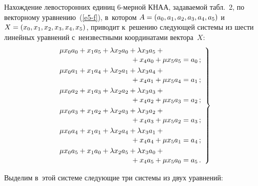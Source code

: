 \begin{multicols}{2}
  Нахождение левосторонних единиц 6-мер\-ной КНАА, задаваемой табл.~2, 
по векторному уравнению~(\ref{e5-f}), в~котором $A\hm= (a_0, a_1, a_2, a_3, 
a_4, a_5)$ и~$X\hm= (x_0, x_1, x_2, x_3, x_4, x_5)$, приводит к~решению 
следующей системы из шести линейных уравнений с~неизвестными 
координатами вектора~$X$:
  \begin{equation}
  \left.
  \begin{array}{rl}
  \mu x_0a_0+x_1a_5+\lambda x_2a_0+\lambda x_3 a_5+{}&\\[1pt]
  &\hspace*{-20mm}{}+x_4a_0+\mu x_5a_5=a_0\,;\\[3pt]
  \mu x_0a_1+x_1 a_4+\lambda x_2a_1+\lambda x_3 a_4+{}&\\[1pt]
&  \hspace*{-20mm}{}+x_4a_1+\mu x_5a_4=a_1\,;\\[3pt]
  \mu x_0a_2+x_1 a_3+\lambda x_2a_2+\lambda x_3 a_3+{}&\\[1pt]
&\hspace*{-20mm}{}+  x_4a_2+\mu x_5a_3=a_2\,;\\[3pt]
  \mu x_0a_3+x_1 a_2+\lambda x_2a_3+\lambda x_3 a_2+{}&\\[1pt]
  &\hspace*{-20mm}{}+x_4a_3+\mu  x_5a_2=a_3\,;\\[3pt]
  \mu x_0a_4+x_1 a_1+\lambda x_2a_4+\lambda x_3 a_1+{}&\\[1pt]
  &\hspace*{-20mm}{}+x_4a_4+\mu x_5a_1=a_4\,;\\[3pt]
  \mu x_0a_5+x_1 a_0+\lambda x_2a_5+\lambda x_3 a_0+{}&\\[1pt]
  &\hspace*{-20mm}{}+x_4a_5+\mu  x_5a_0=a_5\,.
  \end{array}
  \right\}
  \label{e13-f}
  \end{equation}
  
  

  

  Выделим в~этой системе следующие три системы из двух уравнений:
  

\end{multicols}
